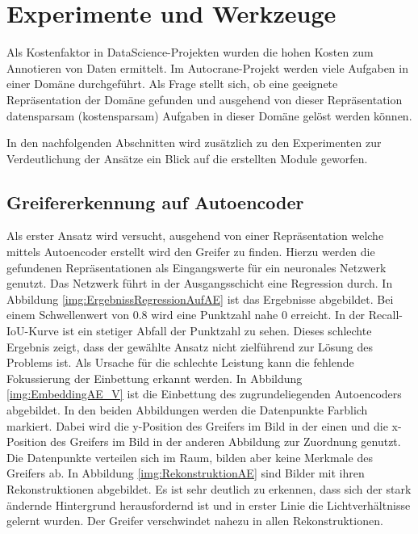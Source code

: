 \chapter{Experimente und Werkzeuge}
\label{chap:HauptteilMultiTaskLernen}
Als Kostenfaktor in DataScience-Projekten wurden die hohen Kosten zum Annotieren von Daten ermittelt. Im Autocrane-Projekt werden viele Aufgaben in einer Domäne durchgeführt. Als Frage stellt sich, ob eine geeignete Repräsentation der Domäne gefunden und ausgehend von dieser Repräsentation datensparsam (kostensparsam) Aufgaben in dieser Domäne gelöst werden können.  

In den nachfolgenden Abschnitten wird zusätzlich zu den Experimenten zur Verdeutlichung der Ansätze ein Blick auf die erstellten Module geworfen.

	\section{Greifererkennung auf Autoencoder}
	\label{sec:GreifererkennungAufAutoencoder}
	Als erster Ansatz wird versucht, ausgehend von einer Repräsentation welche mittels Autoencoder erstellt wird den Greifer zu finden. Hierzu werden die gefundenen Repräsentationen als Eingangswerte für ein neuronales Netzwerk genutzt. Das Netzwerk führt in der Ausgangsschicht eine Regression durch. In Abbildung \ref{img:ErgebnissRegressionAufAE} ist das Ergebnisse abgebildet. Bei einem Schwellenwert von 0.8 wird eine Punktzahl nahe 0 erreicht. In der Recall-IoU-Kurve ist ein stetiger Abfall der Punktzahl zu sehen. Dieses schlechte Ergebnis zeigt, dass der gewählte Ansatz nicht zielführend zur Lösung des Problems ist. Als Ursache für die schlechte Leistung kann die fehlende Fokussierung der Einbettung erkannt werden. In Abbildung \ref{img:EmbeddingAE_V} ist die Einbettung des zugrundeliegenden Autoencoders abgebildet. In den beiden Abbildungen werden die Datenpunkte Farblich markiert. Dabei wird die y-Position des Greifers im Bild in der einen und die x-Position des Greifers im Bild in der anderen Abbildung zur Zuordnung genutzt. Die Datenpunkte verteilen sich im Raum, bilden aber keine Merkmale des Greifers ab. In Abbildung \ref{img:RekonstruktionAE} sind Bilder mit ihren Rekonstruktionen abgebildet. Es ist sehr deutlich zu erkennen, dass sich der stark ändernde Hintergrund herausfordernd ist und in erster Linie die Lichtverhältnisse gelernt wurden. Der Greifer verschwindet nahezu in allen Rekonstruktionen.   
    

